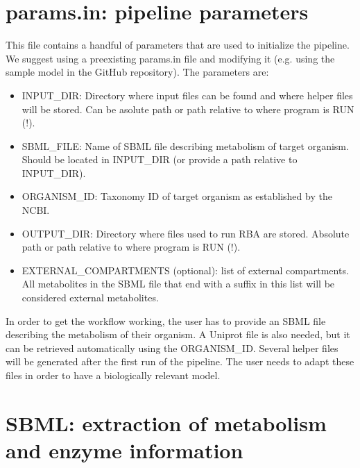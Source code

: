 
\section{params.in: pipeline parameters}

This file contains a handful of parameters that are used to initialize the pipeline.
We suggest using a preexisting params.in file and modifying it
(e.g. using the sample model in the GitHub repository).
The parameters are:

\begin{itemize}
  \item INPUT\_DIR:
  Directory where input files can be found and where helper files will be
  stored. Can be asolute path or path relative to where program is RUN (!).
\item SBML\_FILE:
Name of SBML file describing metabolism of target organism.
Should be located in INPUT\_DIR (or provide a path relative to INPUT\_DIR).
\item ORGANISM\_ID: Taxonomy ID of target organism as established by the NCBI.
\item OUTPUT\_DIR:
Directory where files used to run RBA are stored. Absolute path or path
relative to where program is RUN (!).
\item EXTERNAL\_COMPARTMENTS (optional): list of external compartments.
All metabolites in the SBML file that end with a suffix in this list will
be considered external metabolites.
\end{itemize}

In order to get the workflow working,
the user has to provide an SBML file describing the metabolism of their organism.
A Uniprot file is also needed, but it can be retrieved automatically using the ORGANISM\_ID.
Several helper files will be generated after the first run of the pipeline.
The user needs to adapt these files in order to have a biologically relevant model.

\section{SBML: extraction of metabolism and enzyme information}

